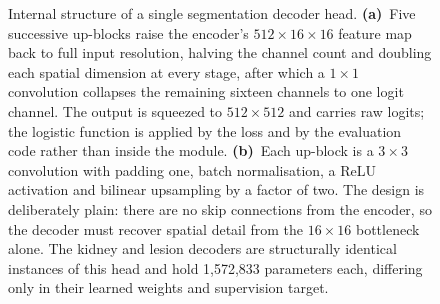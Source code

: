\begin{figure}[t]
{}
\caption{Internal structure of a single segmentation decoder head.
\textbf{(a)}~Five successive up-blocks raise the encoder's
$512{\times}16{\times}16$ feature map back to full input resolution, halving the
channel count and doubling each spatial dimension at every stage, after which a
$1{\times}1$ convolution collapses the remaining sixteen channels to one logit
channel. The output is squeezed to $512{\times}512$ and carries raw logits; the
logistic function is applied by the loss and by the evaluation code rather than
inside the module. \textbf{(b)}~Each up-block is a $3{\times}3$ convolution with
padding one, batch normalisation, a ReLU activation and bilinear upsampling by a
factor of two. The design is deliberately plain: there are no skip connections
from the encoder, so the decoder must recover spatial detail from the
$16{\times}16$ bottleneck alone. The kidney and lesion decoders are structurally
identical instances of this head and hold 1,572,833 parameters each, differing
only in their learned weights and supervision target.}\label{fig:decoder}
\end{figure}
